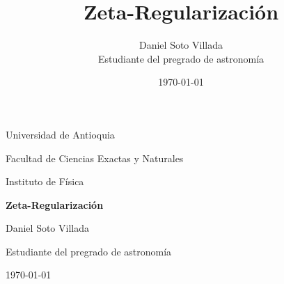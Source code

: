 \documentclass[12pt,letterpaper]{report}
\title{Zeta-Regularización}
\author{Daniel Soto Villada\\Estudiante del pregrado de astronomía}
\date{\today}
\begin{document}
\begin{titlepage}
    \centering
    {\Large Universidad de Antioquia\par}
    \vspace{0.5cm}
    {\large Facultad de Ciencias Exactas y Naturales\par}
    \vspace{0.5cm}
    {\large Instituto de Física\par}
    \vfill
    {\Huge\bfseries Zeta-Regularización\par}
    \vfill
    {\large Daniel Soto Villada\par}
    \vspace{0.3cm}
    {\large Estudiante del pregrado de astronomía\par}
    \vfill
    {\large \today\par}
\end{titlepage}

\tableofcontents
\newpage






\end{document}
